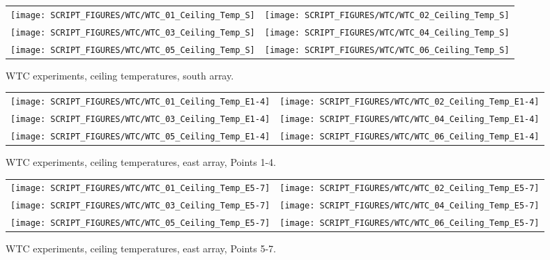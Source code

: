 \begin{figure}[p]
\begin{tabular*}{\textwidth}{l@{\extracolsep{\fill}}r}
\texttt{[image: SCRIPT\_FIGURES/WTC/WTC\_01\_Ceiling\_Temp\_S]} &
\texttt{[image: SCRIPT\_FIGURES/WTC/WTC\_02\_Ceiling\_Temp\_S]} \\
\texttt{[image: SCRIPT\_FIGURES/WTC/WTC\_03\_Ceiling\_Temp\_S]} &
\texttt{[image: SCRIPT\_FIGURES/WTC/WTC\_04\_Ceiling\_Temp\_S]} \\
\texttt{[image: SCRIPT\_FIGURES/WTC/WTC\_05\_Ceiling\_Temp\_S]} &
\texttt{[image: SCRIPT\_FIGURES/WTC/WTC\_06\_Ceiling\_Temp\_S]}
\end{tabular*}
\caption[WTC experiments, ceiling temperatures, south array]{WTC experiments, ceiling temperatures, south array.}
\label{NIST_WTC_Ceiling_S}
\end{figure}

\begin{figure}[p]
\begin{tabular*}{\textwidth}{l@{\extracolsep{\fill}}r}
\texttt{[image: SCRIPT\_FIGURES/WTC/WTC\_01\_Ceiling\_Temp\_E1-4]} &
\texttt{[image: SCRIPT\_FIGURES/WTC/WTC\_02\_Ceiling\_Temp\_E1-4]} \\
\texttt{[image: SCRIPT\_FIGURES/WTC/WTC\_03\_Ceiling\_Temp\_E1-4]} &
\texttt{[image: SCRIPT\_FIGURES/WTC/WTC\_04\_Ceiling\_Temp\_E1-4]} \\
\texttt{[image: SCRIPT\_FIGURES/WTC/WTC\_05\_Ceiling\_Temp\_E1-4]} &
\texttt{[image: SCRIPT\_FIGURES/WTC/WTC\_06\_Ceiling\_Temp\_E1-4]}
\end{tabular*}
\caption[WTC experiments, ceiling temperatures, east array, Points 1-4]{WTC experiments, ceiling temperatures, east array, Points 1-4.}
\label{NIST_WTC_Ceiling_E1-4}
\end{figure}

\begin{figure}[p]
\begin{tabular*}{\textwidth}{l@{\extracolsep{\fill}}r}
\texttt{[image: SCRIPT\_FIGURES/WTC/WTC\_01\_Ceiling\_Temp\_E5-7]} &
\texttt{[image: SCRIPT\_FIGURES/WTC/WTC\_02\_Ceiling\_Temp\_E5-7]} \\
\texttt{[image: SCRIPT\_FIGURES/WTC/WTC\_03\_Ceiling\_Temp\_E5-7]} &
\texttt{[image: SCRIPT\_FIGURES/WTC/WTC\_04\_Ceiling\_Temp\_E5-7]} \\
\texttt{[image: SCRIPT\_FIGURES/WTC/WTC\_05\_Ceiling\_Temp\_E5-7]} &
\texttt{[image: SCRIPT\_FIGURES/WTC/WTC\_06\_Ceiling\_Temp\_E5-7]}
\end{tabular*}
\caption[WTC experiments, ceiling temperatures, east array, Points 5-7]{WTC experiments, ceiling temperatures, east array, Points 5-7.}
\label{NIST_WTC_Ceiling_E5-7}
\end{figure}


